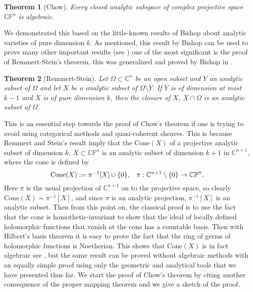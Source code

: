 \documentclass[12pt,twoside,a4paper]{report}
\newtheorem{theorem}{Theorem}[section]
\newcommand{\co}{\ensuremath{\mathbb C }}
\newcommand{\con}{\ensuremath{\mathbb{C}^n}}
\newcommand{\cp}{\ensuremath{\mathbb{CP}}}
\newcommand{\om}{\ensuremath{\Omega}}
\begin{document}
\begin{theorem}[Chow]\label{Chow}
        Every closed analytic subspace of complex projective space $\cp^{n}$ is algebraic.
\end{theorem}
\noindent We demonstrated this based on the little-known results of Bishop about analytic varieties of pure dimension $k$.
\noindent As mentioned, this result by Bishop can be used to prove many other important
results (see \cite{Stolzenberg}) one of the most significant is the proof of
Remmert-Stein's theorem, this was generalized and proved by Bishop in
\cite{Bishop}.

\begin{theorem}[Remmert-Stein]\label{Rem-Stein}
        Let $\om\subset\con$ be an open subset and $Y$ an analytic subset
        of $\om$ and let $X$ be a analytic subset of
        $\om\setminus Y$. If $Y$ is of dimension at most $k-1$ and $X$ is of pure dimension $k$,
        then the closure of $X$, $\overline{X}\cap\om$ is an analytic subset of $\om$.
\end{theorem}
This is an essential step towards the proof of Chow's theorem if one is trying to avoid using categorical methods and
quasi-coherent sheaves. This is because Remmert and Stein's result imply that the $\textrm{Cone}(X)$ of a projective analytic
subset of dimension $k$, $X\subset\cp^n$ is an analytic subset of dimension $k+1$ in $\co^{n+1}$, where the cone is defined by
\begin{equation}
\textrm{Cone}(X):=\pi^{-1}[X]\cup\lbrace0\rbrace,\hspace{0.3cm}\pi:\co^{n+1}\setminus\lbrace 0\rbrace\rightarrow\cp^n.
\end{equation}
\noindent Here $\pi$ is the usual projection of $\co^{n+1}$ on to the
projective space, so clearly $\textrm{Cone}(X)=\overline{\pi^{-1}[X]}$, and since $\pi$
is an analytic projection, $\pi^{-1}[X]$ is an analytic subset. Then from this
point on, the classical proof is to use the fact that the cone is homothetic-invariant to
show that the ideal of locally defined holomorphic functions that vanish at the
cone has a countable basis. Then with Hilbert's basis theorem it is easy to prove the
fact that the ring of germs of holomorphic functions is Noetherian. This shows
that $\textrm{Cone}(X)$ is in fact algebraic see \cite{Chirka}, but the same result can
be proved without algebraic methods with an equally simple proof using only
the geometric and analytical tools that we have presented thus far.  We start
the proof of Chow's theorem by citing another consequence of the proper mapping
theorem and we give a sketch of the proof.
\end{document}
